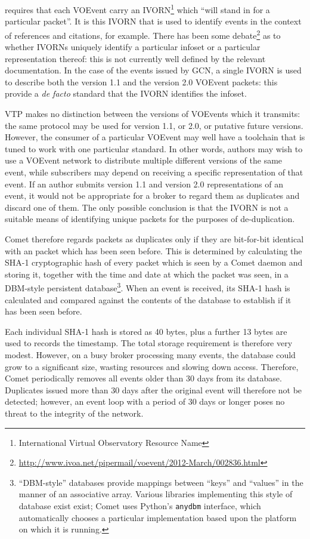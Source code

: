 \documentclass[5p,authoryear]{elsarticle}
\begin{document}
\citet{Seaman:2011} requires that each VOEvent carry an
IVORN\footnote{International Virtual Observatory Resource Name} which ``will
stand in for a particular packet''. It is this IVORN that is used to identify
events in the context of references and citations, for example. There has been
some
debate\footnote{\url{http://www.ivoa.net/pipermail/voevent/2012-March/002836.html}}
as to whether IVORNs uniquely identify a particular infoset or a particular
representation thereof: this is not currently well defined by the relevant
documentation. In the case of the events issued by GCN, a single IVORN is used
to describe both the version 1.1 and the version 2.0 VOEvent packets: this
provide a \textit{de facto} standard that the IVORN identifies the infoset.

VTP makes no distinction between the versions of VOEvents which it transmits:
the same protocol may be used for version 1.1, or 2.0, or putative future
versions. However, the consumer of a particular VOEvent may well have a
toolchain that is tuned to work with one particular standard. In other words,
authors may wish to use a VOEvent network to distribute multiple different
versions of the same event, while subscribers may depend on receiving a
specific representation of that event. If an author submits version 1.1 and
version 2.0 representations of an event, it would not be appropriate for a
broker to regard them as duplicates and discard one of them. The only possible
conclusion is that the IVORN is not a suitable means of identifying unique
packets for the purposes of de-duplication.

Comet therefore regards packets as duplicates only if they are bit-for-bit
identical with an packet which has been seen before. This is determined by
calculating the SHA-1 \citep{Eastlake:2001} cryptographic hash of every packet
which is seen by a Comet daemon and storing it, together with the time and
date at which the packet was seen, in a DBM-style \citep{DBM:1979} persistent
database\footnote{``DBM-style'' databases provide mappings between ``keys''
and ``values'' in the manner of an associative array. Various libraries
implementing this style of database exist exist; Comet uses Python's
\texttt{anydbm} interface, which automatically chooses a particular
implementation based upon the platform on which it is running.}. When an event
is received, its SHA-1 hash is calculated and compared against the contents of
the database to establish if it has been seen before.

Each individual SHA-1 hash is stored as 40 bytes, plus a further 13 bytes are
used to records the timestamp. The total storage requirement is therefore very
modest. However, on a busy broker processing many events, the database could
grow to a significant size, wasting resources and slowing down access.
Therefore, Comet periodically removes all events older than 30 days from its
database. Duplicates issued more than 30 days after the original event will
therefore not be detected; however, an event loop with a period of 30 days or
longer poses no threat to the integrity of the network.
\end{document}
